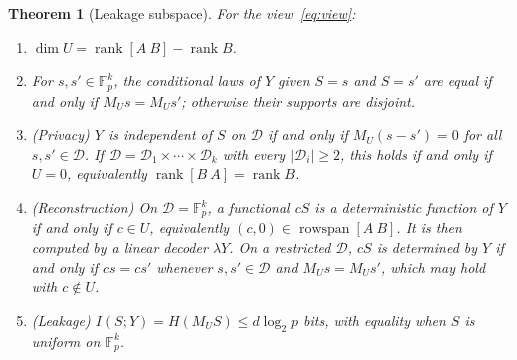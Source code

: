 \documentclass[pdflatex,sn-mathphys-num]{sn-jnl}%
\theoremstyle{plain}
\newtheorem{theorem}{Theorem}
\theoremstyle{definition}
\newcommand{\F}{\mathbb{F}}
\newcommand{\rk}{\operatorname{rank}}
\begin{document}
\begin{keyresult}
\begin{theorem}[Leakage subspace]\label{thm:leakage}
For the view~\eqref{eq:view}:
\begin{enumerate}
\item $\dim U=\rk[A\ B]-\rk B$.
\item For $s,s'\in\F_p^k$, the conditional laws of $Y$ given $S=s$ and $S=s'$ are equal if and only if $M_Us=M_Us'$; otherwise their supports are disjoint.
\item (Privacy) $Y$ is independent of $S$ on $\mathcal D$ if and only if $M_U(s-s')=0$ for all $s,s'\in \mathcal D$. If $\mathcal D=\mathcal D_1\times\cdots\times \mathcal D_k$ with every $|\mathcal D_i|\ge2$, this holds if and only if $U=0$, equivalently $\rk[B\ A]=\rk B$.
\item (Reconstruction) On $\mathcal D=\F_p^k$, a functional $cS$ is a deterministic function of $Y$ if and only if $c\in U$, equivalently $(c,0)\in\operatorname{rowspan}[A\ B]$. It is then computed by a linear decoder $\lambda Y$. On a restricted $\mathcal D$, $cS$ is determined by $Y$ if and only if $cs=cs'$ whenever $s,s'\in \mathcal D$ and $M_Us=M_Us'$, which may hold with $c\notin U$.
\item (Leakage) $I(S;Y)=H(M_US)\le d\log_2p$ bits, with equality when $S$ is uniform on $\F_p^k$.
\end{enumerate}
\end{theorem}
\end{keyresult}
\end{document}

